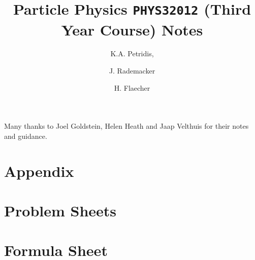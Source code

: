 \documentclass[a4paper,11pt]{article}
\title{\boldmath Particle Physics \texttt{{\bf PHYS32012}} (Third Year Course) Notes}
\author[a]{K.A. Petridis,}
\author[a]{J. Rademacker}
\author[a]{H. Flaecher}
\affiliation[a]{University of Bristol,Bristol, UK}
\begin{document}
 
\linenumbers

\maketitle
\flushbottom
\acknowledgments
Many thanks to Joel Goldstein, Helen Heath and Jaap Velthuis
for their notes and guidance.
\newpage




% 


\newpage


\newpage


\newpage


%
 
\newpage




%











\appendix
\section*{Appendix}








%
\section{Problem Sheets}




\cleardoublepage

\section{Formula Sheet}
\label{sec:formulaSheet}



\cleardoublepage



\end{document}
